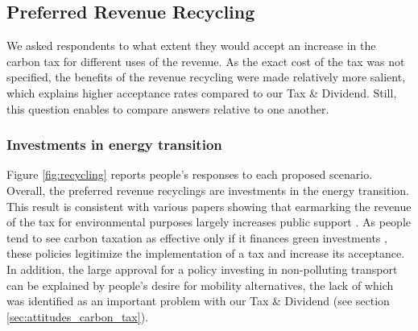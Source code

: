 \documentclass[english,5p,authoryear]{elsarticle}
\begin{document}
    \subsection{Preferred Revenue Recycling}

We asked respondents to what extent they would accept an increase in the carbon tax for different uses of the revenue. As the exact cost of the tax was not specified, the benefits of the revenue recycling were made relatively more salient, which explains higher acceptance rates compared to our Tax \& Dividend. Still, this question enables to compare answers relative to one another.

        \subsubsection{Investments in energy transition}

Figure \ref{fig:recycling} reports people's responses to each proposed scenario. Overall, the preferred revenue recyclings are investments in the energy transition. This result is consistent with various papers showing that earmarking the revenue of the tax for environmental purposes largely increases public support \citep[for a review of the literature, see for instance][]{kallbekken_aasen_2010,carattini_overcoming_2018}. As people tend to see carbon taxation as effective only if it finances green investments \citep{saelen_kallbekken_2011}, these policies legitimize the implementation of a tax and increase its acceptance. In addition, the large approval for a policy investing in non-polluting transport can be explained by people's desire for mobility alternatives, the lack of which was identified as an important problem with our Tax \& Dividend (see section \ref{sec:attitudes_carbon_tax}). %
\end{document}
